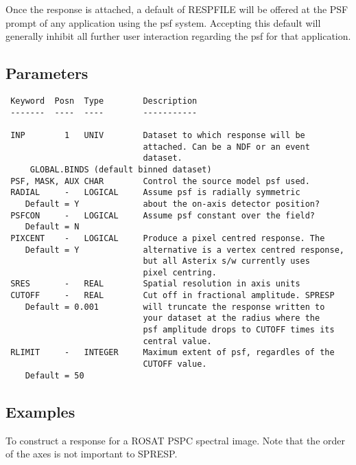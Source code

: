 \documentclass{book}
\renewcommand{\_}{{\tt\char'137}}     %
\begin{document}
Once the response is attached, a default of RESPFILE will be
offered at the PSF prompt of any application using the psf system.
Accepting this default will generally inhibit all further user
interaction regarding the psf for that application.

\subsection{Parameters}
\begin{verbatim}
 Keyword  Posn  Type        Description
 -------  ----  ----        -----------

 INP        1   UNIV        Dataset to which response will be
                            attached. Can be a NDF or an event
                            dataset.
     GLOBAL.BINDS (default binned dataset)
 PSF, MASK, AUX CHAR        Control the source model psf used.
 RADIAL     -   LOGICAL     Assume psf is radially symmetric
    Default = Y             about the on-axis detector position?
 PSFCON     -   LOGICAL     Assume psf constant over the field?
    Default = N
 PIXCENT    -   LOGICAL     Produce a pixel centred response. The
    Default = Y             alternative is a vertex centred response,
                            but all Asterix s/w currently uses
                            pixel centring.
 SRES       -   REAL        Spatial resolution in axis units
 CUTOFF     -   REAL        Cut off in fractional amplitude. SPRESP
    Default = 0.001         will truncate the response written to
                            your dataset at the radius where the
                            psf amplitude drops to CUTOFF times its
                            central value.
 RLIMIT     -   INTEGER     Maximum extent of psf, regardles of the
                            CUTOFF value.
    Default = 50

\end{verbatim}\subsection{Examples}
To construct a response for a ROSAT PSPC spectral image. Note that
the order of the axes is not important to SPRESP.
\end{document}
